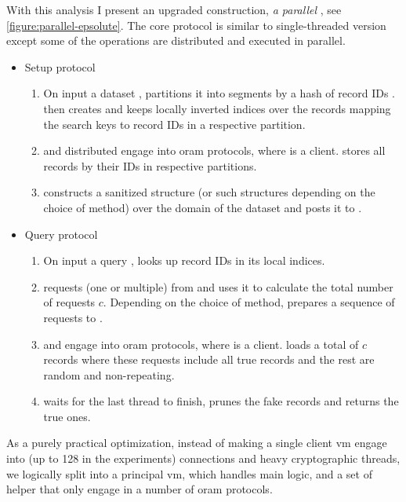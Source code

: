 				With this analysis I present an upgraded construction, \emph{a parallel \epsolute{}}, see \cref{figure:parallel-epsolute}.
				The core protocol is similar to single-threaded version except some of the operations are distributed and executed in parallel.
				\begin{itemize}
					\item
						Setup protocol \protocolSetup{}
						\begin{enumerate}
							\item
								On input a dataset \database{}, \user{} partitions it into \oramsNumber{} segments  by a hash of record IDs \recordID{}.
								\user{} then creates and keeps locally \oramsNumber{} inverted indices over the records mapping the search keys \searchKey{} to record IDs \recordID{} in a respective partition.
							\item
								\user{} and distributed \server{} engage into \oramsNumber{} \acrshort{oram} protocols, where \user{} is a client.
								\user{} stores all records by their IDs in respective \server{} partitions.
							\item
								\user{} constructs a sanitized structure \serverDS{} (or \oramsNumber{} such structures depending on the choice of method) over the domain of the dataset and posts it to \server{}.
						\end{enumerate}
					\item
						Query protocol \protocolQuery{}
						\begin{enumerate}
							\item
								On input a query \query{}, \user{} looks up record IDs in its local indices.
							\item
								\user{} requests \serverDS{} (one or multiple) from \server{} and uses it to calculate the total number of requests $c$.
								Depending on the choice of method, \user{} prepares a sequence of requests to \server{}.
							\item
								\user{} and \server{} engage into \oramsNumber{} \acrshort{oram} protocols, where \user{} is a client.
								\user{} loads a total of $c$ records where these requests include all true records and the rest are random and non-repeating.
							\item
								\user{} waits for the last thread to finish, prunes the fake records and returns the true ones.
						\end{enumerate}
				\end{itemize}

				As a purely practical optimization, instead of making a single client \acrshort{vm} engage into \oramsNumber{} (up to 128 in the experiments) connections and heavy cryptographic threads, we logically split \user{} into a principal \acrshort{vm}, which handles main logic, and a set of helper  that only engage in a number of \acrshort{oram} protocols.

				

